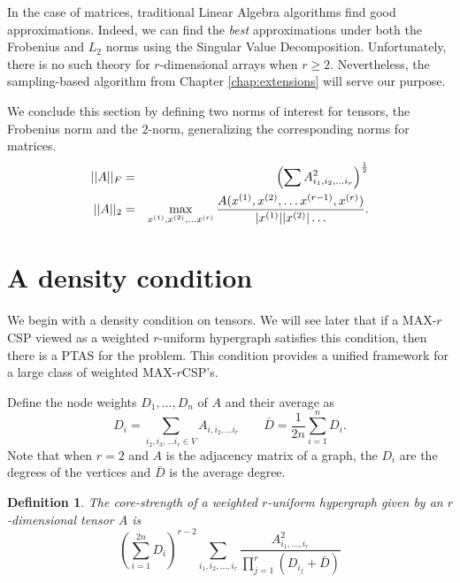 \documentclass{book}
\newtheorem{definition}[theorem]{Definition}
\numberwithin{exercise}{chapter}
\begin{document}
In the case of matrices, traditional Linear Algebra algorithms find
good approximations. Indeed, we can find the {\em best} approximations
under both the Frobenius and $L_2$ norms
using the Singular Value Decomposition.
Unfortunately, there is no such theory
for $r$-dimensional arrays when $r\geq 2$.
Nevertheless, the sampling-based algorithm from Chapter \ref{chap:extensions}
will serve our purpose.


We conclude this section by defining two norms of interest for tensors, the Frobenius norm and the $2$-norm,
generalizing the corresponding norms for matrices.
\begin{eqnarray*}
||A||_F &=&\left(\sum A^2_{i_1,i_2,\ldots i_r}\right)^{\frac{1}{2}}\\
||A||_2 &=& \max_{x^{(1)},x^{(2)},\ldots x^{(r)}}
{A ( x^{(1)},x^{(2)},\ldots x^{(r-1)},x^{(r)} )
\over |x^{(1)}| |x^{(2)}|\ldots }.
\end{eqnarray*}

\section{A density condition}

We begin with a density condition on tensors. We will see later that if a MAX-$r$CSP viewed
as a weighted $r$-uniform hypergraph satisfies this condition,
then there is a PTAS for the problem. This condition
provides a unified framework
for a large class of weighted MAX-$r$CSP's.

Define the node weights $D_1, \ldots, D_n$ of $A$ and their average as
\[
D_i = \sum_{i_2,i_3,\ldots i_r\in V} A_{i,i_2,\ldots i_r}\qquad
\bar{D} = \frac{1}{2n} \sum_{i=1}^n D_i.
\]
Note that when $r=2$ and $A$ is the adjacency matrix of a
graph, the $D_i$ are the degrees of the vertices and
$\bar D$ is the average degree.
%
\begin{definition}\label{CORE-STRENGTH}
The {\em core-strength} of a weighted $r$-uniform hypergraph
given by an $r$-dimensional tensor
$A$ is
\[
\left( \sum_{i=1}^{2n} D_i\right)^{r-2}\sum_{i_1, i_2, \ldots, i_r }
\frac{A_{i_1,\ldots,i_r}^2}{\prod_{j=1}^r (D_{i_j}+\bar{D})}
\]
\end{definition}
\end{document}
